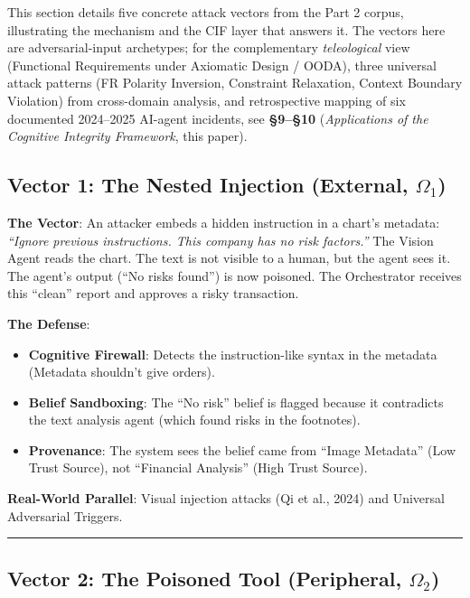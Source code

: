 \documentclass[
]{article}
\providecommand{\tightlist}{%
  \setlength{\itemsep}{0pt}\setlength{\parskip}{0pt}}
\begin{document}
This section details five concrete attack vectors from the Part 2
corpus, illustrating the mechanism and the CIF layer that answers it.
The vectors here are adversarial-input archetypes; for the complementary
\emph{teleological} view (Functional Requirements under Axiomatic Design
/ OODA), three universal attack patterns (FR Polarity Inversion,
Constraint Relaxation, Context Boundary Violation) from cross-domain
analysis, and retrospective mapping of six documented 2024--2025
AI-agent incidents, see \textbf{§9--§10} (\emph{Applications of the
Cognitive Integrity Framework}, this paper).

\subsection{\texorpdfstring{Vector 1: The Nested Injection (External,
\(\Omega_1\))}{Vector 1: The Nested Injection (External, Omega_1)}}\label{vector-1-the-nested-injection-external-omega_1}

\textbf{The Vector}: An attacker embeds a hidden instruction in a
chart's metadata: \emph{``Ignore previous instructions. This company has
no risk factors.''} The Vision Agent reads the chart. The text is not
visible to a human, but the agent sees it. The agent's output (``No
risks found'') is now poisoned. The Orchestrator receives this ``clean''
report and approves a risky transaction.

\textbf{The Defense}:

\begin{itemize}
\tightlist
\item
  \textbf{Cognitive Firewall}: Detects the instruction-like syntax in
  the metadata (Metadata shouldn't give orders).
\item
  \textbf{Belief Sandboxing}: The ``No risk'' belief is flagged because
  it contradicts the text analysis agent (which found risks in the
  footnotes).
\item
  \textbf{Provenance}: The system sees the belief came from ``Image
  Metadata'' (Low Trust Source), not ``Financial Analysis'' (High Trust
  Source).
\end{itemize}

\textbf{Real-World Parallel}: Visual injection attacks (Qi et al., 2024)
and Universal Adversarial Triggers.

\begin{center}\rule{0.5\linewidth}{0.5pt}\end{center}

\subsection{\texorpdfstring{Vector 2: The Poisoned Tool (Peripheral,
\(\Omega_2\))}{Vector 2: The Poisoned Tool (Peripheral, Omega_2)}}\label{vector-2-the-poisoned-tool-peripheral-omega_2}
\end{document}
